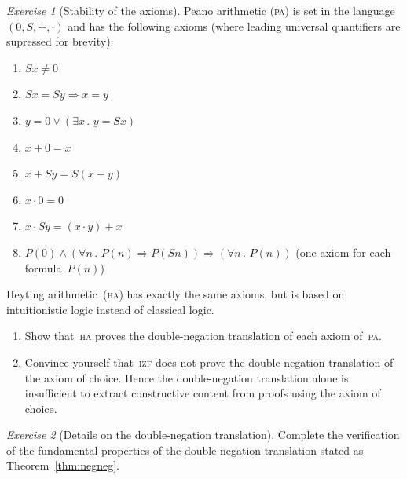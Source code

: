 \documentclass[10pt,reqno,a4paper,openany]{amsbook}
\theoremstyle{definition}
\theoremstyle{plain}
\theoremstyle{remark}
\newcommand{\?}{\,{:}\,}
\renewcommand{\_}{\mathpunct{.}\,}
\newtheorem{exercise}{Exercise}[chapter]
\renewcommand{\theenumi}{\alph{enumi}}
\begin{document}
\begin{exercise}[Stability of the axioms]\label{ex:stability-axioms}
Peano arithmetic (\textsc{pa}) is set in the language~$(0,S,+,\cdot)$ and has
the following axioms (where leading universal quantifiers are supressed for
brevity):
\begin{enumerate}
\renewcommand{\theenumi}{\arabic{enumi}}
\item $Sx \neq 0$
\item $Sx = Sy \Rightarrow x = y$
\item $y = 0 \vee (\exists x\_ y = Sx)$
\item $x + 0 = x$
\item $x + Sy = S(x+y)$
\item $x \cdot 0 = 0$
\item $x \cdot Sy = (x \cdot y) + x$
\item $P(0) \wedge (\forall n\_ P(n) \Rightarrow P(Sn)) \Longrightarrow
(\forall n\_ P(n))$ (one axiom for each formula~$P(n)$)
\end{enumerate}
Heyting arithmetic~(\textsc{ha}) has exactly the same axioms, but is based on intuitionistic
logic instead of classical logic.
\begin{enumerate}
\item Show that~\textsc{ha} proves the double-negation translation of each
axiom of~\textsc{pa}.
\item Convince yourself that~\textsc{izf} does not prove the double-negation
translation of the axiom of choice. Hence the double-negation translation
alone is insufficient to extract constructive content from proofs using the
axiom of choice.
\end{enumerate}
\end{exercise}

\begin{exercise}[Details on the double-negation translation]
Complete the verification of the fundamental properties of the double-negation
translation stated as Theorem~\ref{thm:negneg}.
\end{exercise}
\end{document}
